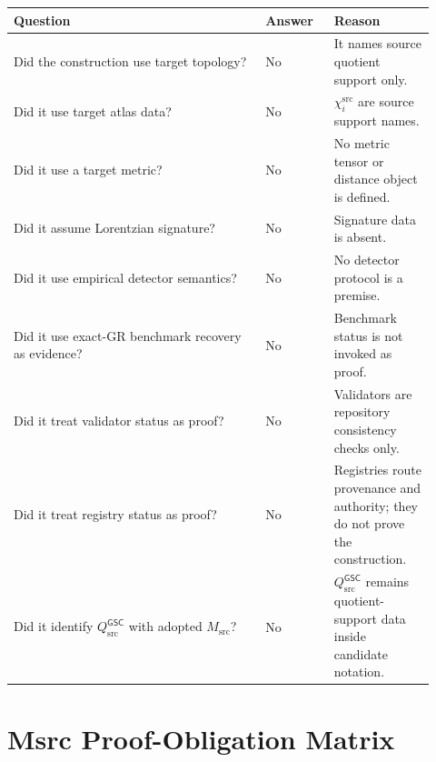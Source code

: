 \documentclass[11pt]{article}
\newcommand{\GSC}{\mathsf{GSC}}
\newcommand{\Msrc}{M_{\mathrm{src}}}
\newcommand{\Qsrc}{Q_{\mathrm{src}}}
\begin{document}
\begin{longtable}{|p{0.55\linewidth}|p{0.15\linewidth}|p{0.22\linewidth}|}
\hline
\textbf{Question} & \textbf{Answer} & \textbf{Reason} \\
\hline
Did the construction use target topology? & No & It names source quotient support only. \\
\hline
Did it use target atlas data? & No & \(\chi_i^{\mathrm{src}}\) are source support names. \\
\hline
Did it use a target metric? & No & No metric tensor or distance object is defined. \\
\hline
Did it assume Lorentzian signature? & No & Signature data is absent. \\
\hline
Did it use empirical detector semantics? & No & No detector protocol is a premise. \\
\hline
Did it use exact-GR benchmark recovery as evidence? & No & Benchmark status is not invoked as proof. \\
\hline
Did it treat validator status as proof? & No & Validators are repository consistency checks only. \\
\hline
Did it treat registry status as proof? & No & Registries route provenance and authority; they do not prove the construction. \\
\hline
Did it identify \(\Qsrc^{\GSC}\) with adopted \(\Msrc\)? & No &
\(\Qsrc^{\GSC}\) remains quotient-support data inside candidate notation. \\
\hline
\end{longtable}

\section{Msrc Proof-Obligation Matrix}
\end{document}
